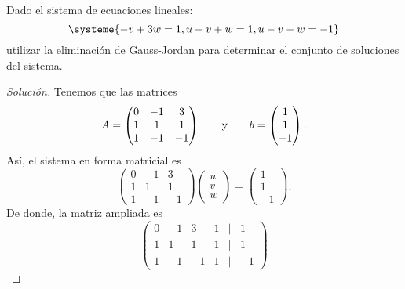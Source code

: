 \documentclass[a4,11pt]{aleph-notas}
\begin{document}
\encabezado

\begin{ejer}
    Dado el sistema de ecuaciones lineales:
    \[
        \systeme{
        -v+3w=1, u+v+w=1, u-v-w=-1
        }
    \]
    utilizar la eliminación de Gauss-Jordan para determinar el conjunto de soluciones del sistema.
\end{ejer}

\begin{proof}[Solución]
    Tenemos que las matrices
    \[
        A = \begin{pmatrix}
            0&-1&3\\1&1&1\\1&-1&-1
        \end{pmatrix}
        \qquad\text{y}\qquad
        b = \begin{pmatrix}
            1 \\ 1\\ -1
        \end{pmatrix}.
    \]
    Así, el sistema en forma matricial es
    \[
        \begin{pmatrix}
            0&-1&3\\1&1&1\\1&-1&-1
        \end{pmatrix}
        \begin{pmatrix}
            u \\ v\\ w
        \end{pmatrix}
        =
        \begin{pmatrix}
            1 \\ 1\\ -1
        \end{pmatrix}.
    \]
    De donde, la matriz ampliada es
    \[
        \begin{pmatrix}
            0&-1&3&1&|&1\\
            1&1&1&1&|&1\\
            1&-1&-1&1&|&-1
        \end{pmatrix}
    \]
    

\end{proof}
\end{document}
